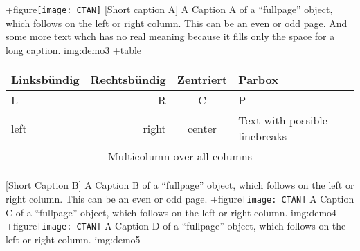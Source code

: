 \documentclass{scrartcl}
\begin{document}
\Float[Multi]
\captionsetup{singlelinecheck=false}
\hvFloat[fullpage,capPos=l,multiFloat]%
  +{figure}{\texttt{[image: CTAN]}}%
   [Short caption A]%
   {A Caption A of a ``fullpage'' object, which follows on the left or
    right column. This can be an even or odd page. And some more text whch has no
    real meaning because it fills only the space for a long caption.}%
   {img:demo3}%
  +{table}{\begin{tabular}{lrcp{3cm}}\hline                 %
            Linksbündig & Rechtsbündig & Zentriert & Parbox\\\hline
            L           & R            & C         & P\\
            left        & right        & center    & Text with possible linebreaks\\
            \multicolumn{4}{c}{Multicolumn over all columns}\\\hline
           \end{tabular}}%
   [Short Caption B]%
   {A Caption B of a ``fullpage'' object, which follows on the left or
        right column. This can be an even or odd page.}{}%
  +{figure}{\texttt{[image: CTAN]}}%
   {A Caption C of a ``fullpage'' object, which follows on the left or
      right column.}%
   {img:demo4}
  +{figure}{\texttt{[image: CTAN]}}%
   {A Caption D of a ``fullpage'' object, which follows on the left or
      right column.}%
   {img:demo5}


\blinddocument

\Blindtext

\blindtext
\end{document}
